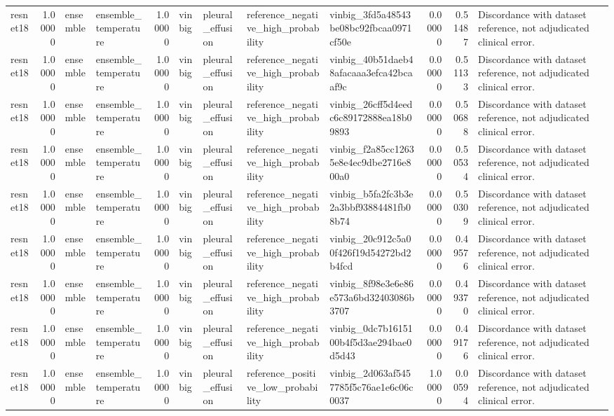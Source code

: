 \begin{tabular}{lrllrllllrrl}
resnet18 & 1.00000 & ensemble & ensemble\_temperature & 1.00000 & vinbig & pleural\_effusion & reference\_negative\_high\_probability & vinbig\_3fd5a48543be08bc92fbcaa0971cf50e & 0.00000 & 0.51487 & Discordance with dataset reference, not adjudicated clinical error. \\
resnet18 & 1.00000 & ensemble & ensemble\_temperature & 1.00000 & vinbig & pleural\_effusion & reference\_negative\_high\_probability & vinbig\_40b51daeb48afacaaa3efca42bcaaf9c & 0.00000 & 0.51133 & Discordance with dataset reference, not adjudicated clinical error. \\
resnet18 & 1.00000 & ensemble & ensemble\_temperature & 1.00000 & vinbig & pleural\_effusion & reference\_negative\_high\_probability & vinbig\_26cff5d4eedc6c89172888ea18b09893 & 0.00000 & 0.50688 & Discordance with dataset reference, not adjudicated clinical error. \\
resnet18 & 1.00000 & ensemble & ensemble\_temperature & 1.00000 & vinbig & pleural\_effusion & reference\_negative\_high\_probability & vinbig\_f2a85cc12635e8e4ec9dbe2716e800a0 & 0.00000 & 0.50534 & Discordance with dataset reference, not adjudicated clinical error. \\
resnet18 & 1.00000 & ensemble & ensemble\_temperature & 1.00000 & vinbig & pleural\_effusion & reference\_negative\_high\_probability & vinbig\_b5fa2fc3b3e2a3bbf93884481fb08b74 & 0.00000 & 0.50309 & Discordance with dataset reference, not adjudicated clinical error. \\
resnet18 & 1.00000 & ensemble & ensemble\_temperature & 1.00000 & vinbig & pleural\_effusion & reference\_negative\_high\_probability & vinbig\_20c912c5a00f426f19d54272bd2b4fcd & 0.00000 & 0.49576 & Discordance with dataset reference, not adjudicated clinical error. \\
resnet18 & 1.00000 & ensemble & ensemble\_temperature & 1.00000 & vinbig & pleural\_effusion & reference\_negative\_high\_probability & vinbig\_8f98e3e6e86e573a6bd32403086b3707 & 0.00000 & 0.49370 & Discordance with dataset reference, not adjudicated clinical error. \\
resnet18 & 1.00000 & ensemble & ensemble\_temperature & 1.00000 & vinbig & pleural\_effusion & reference\_negative\_high\_probability & vinbig\_0dc7b1615100b4f5d3ae294bae0d5d43 & 0.00000 & 0.49176 & Discordance with dataset reference, not adjudicated clinical error. \\
resnet18 & 1.00000 & ensemble & ensemble\_temperature & 1.00000 & vinbig & pleural\_effusion & reference\_positive\_low\_probability & vinbig\_2d063af5457785f5c76ae1e6c06c0037 & 1.00000 & 0.00594 & Discordance with dataset reference, not adjudicated clinical error. \\

\end{tabular}
